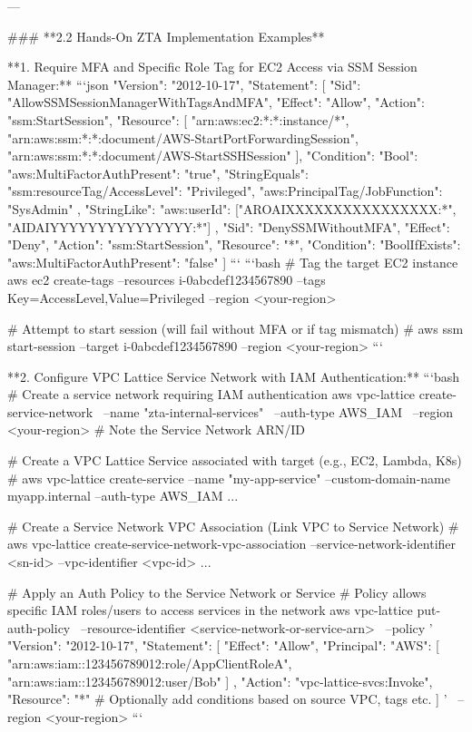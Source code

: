 \documentclass{article}
\begin{document}
---

### **2.2 Hands-On ZTA Implementation Examples**

**1. Require MFA and Specific Role Tag for EC2 Access via SSM Session Manager:**
```json
{
    "Version": "2012-10-17",
    "Statement": [
        {
            "Sid": "AllowSSMSessionManagerWithTagsAndMFA",
            "Effect": "Allow",
            "Action": "ssm:StartSession",
            "Resource": [
                "arn:aws:ec2:*:*:instance/*",
                "arn:aws:ssm:*:*:document/AWS-StartPortForwardingSession", 
                "arn:aws:ssm:*:*:document/AWS-StartSSHSession"
            ],
            "Condition": {
                "Bool": {"aws:MultiFactorAuthPresent": "true"},
                "StringEquals": {
                    "ssm:resourceTag/AccessLevel": "Privileged", 
                    "aws:PrincipalTag/JobFunction": "SysAdmin" 
                },
                "StringLike": { 
                    "aws:userId": ["AROAIXXXXXXXXXXXXXXXX:*", "AIDAIYYYYYYYYYYYYYYY:*"]
                }
            }
        },
         { 
             "Sid": "DenySSMWithoutMFA",
             "Effect": "Deny",
             "Action": "ssm:StartSession",
             "Resource": "*",
             "Condition": { "BoolIfExists": {"aws:MultiFactorAuthPresent": "false"} }
         }
    ]
}
```
```bash
# Tag the target EC2 instance
aws ec2 create-tags --resources i-0abcdef1234567890 --tags Key=AccessLevel,Value=Privileged --region <your-region>

# Attempt to start session (will fail without MFA or if tag mismatch)
# aws ssm start-session --target i-0abcdef1234567890 --region <your-region>
```

**2. Configure VPC Lattice Service Network with IAM Authentication:**
```bash
# Create a service network requiring IAM authentication
aws vpc-lattice create-service-network \
  --name "zta-internal-services" \
  --auth-type AWS_IAM \
  --region <your-region>
# Note the Service Network ARN/ID

# Create a VPC Lattice Service associated with target (e.g., EC2, Lambda, K8s)
# aws vpc-lattice create-service --name "my-app-service" --custom-domain-name myapp.internal --auth-type AWS_IAM ...

# Create a Service Network VPC Association (Link VPC to Service Network)
# aws vpc-lattice create-service-network-vpc-association --service-network-identifier <sn-id> --vpc-identifier <vpc-id> ...

# Apply an Auth Policy to the Service Network or Service
# Policy allows specific IAM roles/users to access services in the network
aws vpc-lattice put-auth-policy \
  --resource-identifier <service-network-or-service-arn> \
  --policy '{
    "Version": "2012-10-17",
    "Statement": [
        {
            "Effect": "Allow",
            "Principal": { "AWS": [ "arn:aws:iam::123456789012:role/AppClientRoleA", "arn:aws:iam::123456789012:user/Bob" ] },
            "Action": "vpc-lattice-svcs:Invoke",
            "Resource": "*"
            # Optionally add conditions based on source VPC, tags etc.
        }
    ]
  }' \
  --region <your-region>
```
\end{document}
